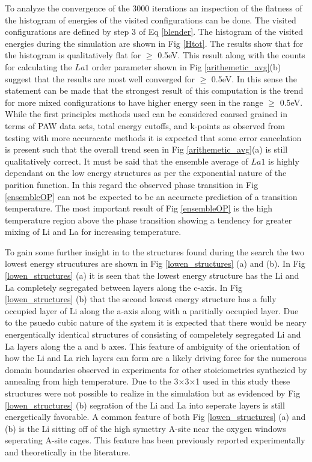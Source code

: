 \documentclass[aps,prl,reprint,superscriptaddress,showkeys]{revtex4-1}
\begin{document}
To analyze the convergence of the 3000 iterations an inspection of the flatness of the histogram of energies of the visited configurations can be done. The visited configurations are defined by step 3 of Eq \ref{blender}. The histogram of the visited energies during the simulation are shown in Fig \ref{Htot}. The results show that for the histogram is qualitatively flat for $\ge$ 0.5eV. This result along with the counts for calculating the $La1$ order parameter shown in Fig \ref{arithemetic_avg}(b) suggest that the results are most well converged for $\ge$ 0.5eV. In this sense the statement can be made that the strongest result of this computation is the trend for more mixed configurations to have higher energy seen in the range $\ge$ 0.5eV. While the first principles methods used can be considered coarsed grained in terms of PAW data sets, total energy cutoffs, and k-points as observed from testing with more accuracate methods it is expected that some error cancelation is present such that the overall trend seen in Fig \ref{arithemetic_avg}(a) is still qualitatively correct. It must be said that the ensemble average of $La1$ is highly dependant on the low energy structures as per the exponential nature of the parition function. In this regard the observed phase transition in Fig \ref{ensembleOP} can not be expected to be an accuracte prediction of a transition temperature. The most important result of Fig \ref{ensembleOP} is the high temperature region above the phase transition showing a tendency for greater mixing of Li and La for increasing temperature. 

To gain some further insight in to the structures found during the search the two lowest energy strucutures are  shown in  Fig \ref{lowen_structures} (a) and (b). In Fig \ref{lowen_structures} (a) it is seen that the lowest energy structure has the Li and La completely segregated between layers along the c-axis. In Fig  \ref{lowen_structures} (b) that the second lowest energy structure has a fully occupied layer of Li along the a-axis along with a paritially occupied layer.  Due to the psuedo cubic nature of the system it is expected that there would be neary energentically identical structures of consisting of compeletely segregated Li and La layers along the a and b axes. This feature of ambiguity of the orientation of how the Li and La rich layers can form  are a likely driving force for the numerous domain boundaries observed in experiments for other stoiciometries synthezied by annealing from high temperature.   Due to the 3$\times$3$\times$1 used in this study these structures were not possible to realize in the simulation but as evidenced by Fig  \ref{lowen_structures} (b) segration of the Li and La into seperate layers is still energetically favorable. A common feature of both Fig \ref{lowen_structures} (a) and (b) is the Li sitting off of the high symettry A-site near the oxygen windows seperating A-site cages. This feature has been previously reported experimentally and theoretically in the literature\cite{Asitedistribution,imaginary_phonons,Li_La_ordering_computational}. 
\end{document}

